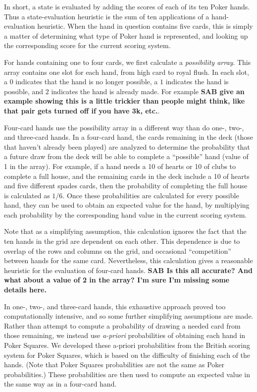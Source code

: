 \documentclass[letterpaper]{article}
\begin{document}
In short, a state is evaluated by adding the scores of each of its ten Poker hands. Thus a state-evaluation heuristic is the sum of ten applications of a hand-evaluation heuristic. When the hand in question contains five cards, this is simply a matter of determining what type of Poker hand is represented, and looking up the corresponding score for the current scoring system.

For hands containing one to four cards, we first calculate a {\it possibility array}. This array contains one slot for each hand, from high card to royal flush. In each slot, a $0$ indicates that the hand is no longer possible, a $1$ indicates the hand is possible, and $2$ indicates the hand is already made. For example {\bf SAB give an example showing this is a little trickier than people might think, like that pair gets turned off if you have 3k, etc.}.

Four-card hands use the possibility array in a different way than do one-, two-, and three-card hands. In a four-card hand, the cards remaining in the deck (those that haven't already been played) are analyzed to determine the probability that a future draw from the deck will be able to complete a ``possible'' hand (value of 1 in the array). For example, if a hand needs a 10 of hearts or 10 of clubs to complete a full house, and the remaining cards in the deck include a 10 of hearts and five different spades cards, then the probability of completing the full house is calculated as $1 / 6$. Once these probabilities are calculated for every possible hand, they can be used to obtain an expected value for the hand, by multiplying each probability by the corresponding hand value in the current scoring system.

Note that as a simplifying assumption, this calculation ignores the fact that the ten hands in the grid are dependent on each other. This dependence is due to overlap of the rows and columns on the grid, and occasional ``competition'' between hands for the same card. Nevertheless, this calculation gives a reasonable heuristic for the evaluation of four-card hands. {\bf SAB Is this all accurate? And what about a value of 2 in the array? I'm sure I'm missing some details here.}

In one-, two-, and three-card hands, this exhaustive approach proved too computationally intensive, and so some further simplifying assumptions are made. Rather than attempt to compute a probability of drawing a needed card from those remaining, we instead use {\it a-priori} probabilities of obtaining each hand in Poker Squares. We developed these a-priori probabilities from the British scoring system for Poker Squares, which is based on the difficulty of finishing each of the hands. (Note that Poker Squares probabilities are not the same as Poker probabilities.) These probabilities are then used to compute an expected value in the same way as in a four-card hand.
\end{document}
